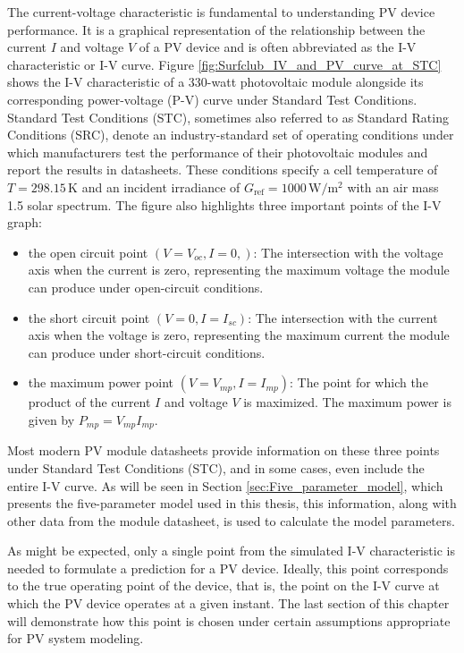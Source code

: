 The current-voltage characteristic is fundamental to understanding PV
device performance. It is a graphical representation of the relationship
between the current \(I\) and voltage \(V\) of a PV device and is often
abbreviated as the I-V characteristic or I-V curve.
Figure \ref{fig:Surfclub_IV_and_PV_curve_at_STC} shows the I-V characteristic of
a 330-watt photovoltaic module alongside its corresponding power-voltage
(P-V) curve under Standard Test Conditions. Standard Test Conditions (STC),
sometimes also referred to as Standard Rating Conditions (SRC), denote
an industry-standard set of operating conditions under which manufacturers
test the performance of their photovoltaic modules and report the results
in datasheets. These conditions specify a cell temperature of \(T = 298.15 \, \si{\kelvin}\)
and an incident irradiance of \(G_{\text{ref}} = 1000 \, \si{\watt\per\meter\squared}\) with an
air mass 1.5 solar spectrum. The figure also highlights three
important points of the I-V graph:

\begin{itemize}
    \item the open circuit point \((V = V_{oc}, I = 0,)\): The intersection with the voltage axis when
        the current is zero, representing the maximum voltage the module can produce under open-circuit conditions.
    \item the short circuit point \((V = 0, I = I_{sc})\): The intersection with the current axis when
        the voltage is zero, representing the maximum current the module can produce under short-circuit conditions.
    \item the maximum power point \((V = V_{mp}, I = I_{mp})\): The point for which the product of
        the current \(I\) and voltage \(V\) is maximized. The maximum power is given by \(P_{mp} = V_{mp} I_{mp}\).
\end{itemize}

Most modern PV module datasheets provide information on
these three points under Standard Test Conditions (STC),
and in some cases, even include the entire I-V curve. As
will be seen in Section \ref{sec:Five_parameter_model},
which presents the five-parameter model used in this thesis,
this information, along with other data from the module
datasheet, is used to calculate the model parameters.

As might be expected, only a single point from
the simulated I-V characteristic is needed to formulate a
prediction for a PV device. Ideally, this point corresponds
to the true operating point of the device, that is, the point
on the I-V curve at which the PV device operates at a
given instant. The last section of this chapter will
demonstrate how this point is chosen under certain
assumptions appropriate for PV system modeling.

